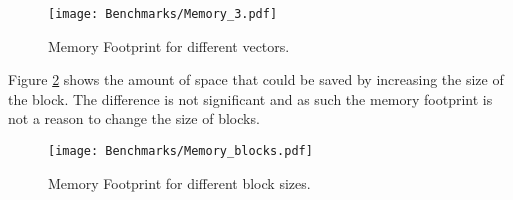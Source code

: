 \begin{figure}[h!]
  \centering
  \texttt{[image: Benchmarks/Memory\_3.pdf]}
  \caption{Memory Footprint for different vectors.}
  \label{MemoryFootprints}
\end{figure}

\FloatBarrier

Figure \ref{MemoryBlocksFootprints} shows the amount of space that could be saved by increasing the size of the block. The difference is not significant and as such the memory footprint is not a reason to change the size of blocks.

\begin{figure}[h!]
  \centering
  \texttt{[image: Benchmarks/Memory\_blocks.pdf]}
  \caption{Memory Footprint for different block sizes.}
  \label{MemoryBlocksFootprints}
\end{figure}

\FloatBarrier

